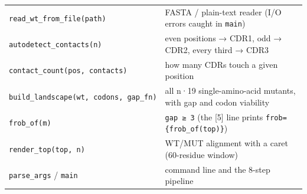 \begin{longtable}[]{@{}ll@{}}
\begin{minipage}[t]{0.47\columnwidth}\raggedright
\texttt{read\_wt\_from\_file(path)}\strut
\end{minipage} & \begin{minipage}[t]{0.47\columnwidth}\raggedright
FASTA / plain-text reader (I/O errors caught in \texttt{main})\strut
\end{minipage}\tabularnewline
\begin{minipage}[t]{0.47\columnwidth}\raggedright
\texttt{autodetect\_contacts(n)}\strut
\end{minipage} & \begin{minipage}[t]{0.47\columnwidth}\raggedright
even positions → CDR1, odd → CDR2, every third → CDR3\strut
\end{minipage}\tabularnewline
\begin{minipage}[t]{0.47\columnwidth}\raggedright
\texttt{contact\_count(pos,\ contacts)}\strut
\end{minipage} & \begin{minipage}[t]{0.47\columnwidth}\raggedright
how many CDRs touch a given position\strut
\end{minipage}\tabularnewline
\begin{minipage}[t]{0.47\columnwidth}\raggedright
\texttt{build\_landscape(wt,\ codons,\ gap\_fn)}\strut
\end{minipage} & \begin{minipage}[t]{0.47\columnwidth}\raggedright
all n·19 single-amino-acid mutants, with gap and codon viability\strut
\end{minipage}\tabularnewline
\begin{minipage}[t]{0.47\columnwidth}\raggedright
\texttt{frob\_of(m)}\strut
\end{minipage} & \begin{minipage}[t]{0.47\columnwidth}\raggedright
\texttt{gap\ ≥\ 3} (the {[}5{]} line prints
\texttt{frob=\{frob\_of(top)\}})\strut
\end{minipage}\tabularnewline
\begin{minipage}[t]{0.47\columnwidth}\raggedright
\texttt{render\_top(top,\ n)}\strut
\end{minipage} & \begin{minipage}[t]{0.47\columnwidth}\raggedright
WT/MUT alignment with a caret (60-residue window)\strut
\end{minipage}\tabularnewline
\begin{minipage}[t]{0.47\columnwidth}\raggedright
\texttt{parse\_args} / \texttt{main}\strut
\end{minipage} & \begin{minipage}[t]{0.47\columnwidth}\raggedright
command line and the 8-step pipeline\strut
\end{minipage}\tabularnewline
\bottomrule
\end{longtable}

